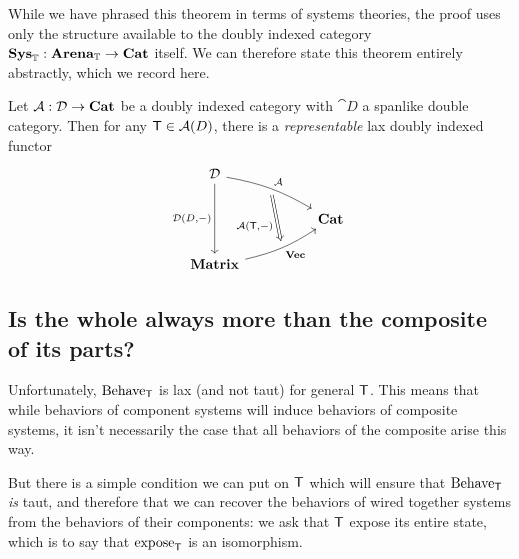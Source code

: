 \documentclass[DynamicalBook]{subfiles}
\begin{document}
While we have phrased this theorem in terms of systems theories, the
proof uses only the structure available to the doubly indexed category
$\textbf{Sys}_{\mathbb{T}} : \textbf{Arena}_{\mathbb{T}} \to \textbf{Cat}$ itself. We can therefore state this
theorem entirely abstractly, which we record here.
\begin{theorem}\label{thm:representable.lax.doubly.indexed.functors}
  Let $\mathcal{A} : \mathcal{D} \to \textbf{Cat}$ be a doubly indexed category with
  $\cat{D}$ a spanlike double category. Then for any $\mathsf{T} \in \mathcal{A}(D)$,
  there is a \emph{representable} lax doubly indexed functor
\[\begin{tikzcd}
	{\cat{D}} \\
	&& {\Cat{Cat}} \\
	{\Cat{Matrix}}
	\arrow[""{name=0, anchor=center, inner sep=0}, "{\cat{A}}", from=1-1,
  to=2-3, bend left = 10]
	\arrow[""{name=1, anchor=center, inner sep=0}, "{\Cat{Vec}}"', from=3-1,
  to=2-3, bend right = 10]
	\arrow["{\cat{D}\left(D,-\right)}"', from=1-1, to=3-1]
	\arrow["{\cat{A}(\Sys{T}, -)}"', shorten <=4pt, shorten >=4pt, Rightarrow,
  from=0, to=1]
\end{tikzcd}\]
\end{theorem}

\subsection{Is the whole always more than the composite of its parts?}
Unfortunately, $\mathrm{Behave}_{\mathsf{T}}$ is lax (and not taut) for general
$\mathsf{T}$. This means that while behaviors of component systems will induce
behaviors of composite systems, it isn't necessarily the case that all behaviors
of the composite arise this way.

But there is a simple condition we can put on $\mathsf{T}$ which will
ensure that $\mathrm{Behave}_{\mathsf{T}}$ \emph{is} taut, and therefore that we can
recover the behaviors of wired together systems from the behaviors of their
components: we ask that $\mathsf{T}$ expose its entire state, which is to say that
$\mathrm{expose}_{\mathsf{T}}$ is an isomorphism.
\end{document}

